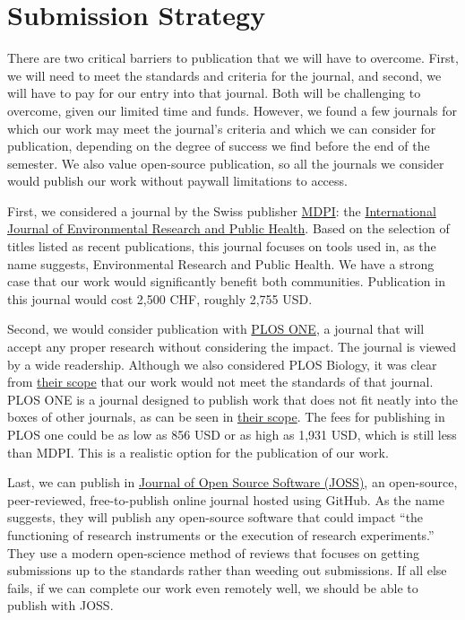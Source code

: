 \section{Submission Strategy}

There are two critical barriers to publication that we will have to overcome. First, we will need to meet the standards and criteria for the journal, and second, we will have to pay for our entry into that journal. Both will be challenging to overcome, given our limited time and funds. However, we found a few journals for which our work may meet the journal's criteria and which we can consider for publication, depending on the degree of success we find before the end of the semester. We also value open-source publication, so all the journals we consider would publish our work without paywall limitations to access. 

First, we considered a journal by the Swiss publisher \href{https://www.mdpi.com/}{MDPI}: the \href{https://www.mdpi.com/journal/ijerph}{International Journal of Environmental Research and Public Health}. Based on the selection of titles listed as recent publications, this journal focuses on tools used in, as the name suggests, Environmental Research and Public Health. We have a strong case that our work would significantly benefit both communities. Publication in this journal would cost 2,500 CHF, roughly 2,755 USD. 

Second, we would consider publication with \href{https://journals.plos.org/plosone/s/journal-information}{PLOS ONE}, a journal that will accept any proper research without considering the impact. The journal is viewed by a wide readership. Although we also considered PLOS Biology, it was clear from \href{https://journals.plos.org/plosbiology/s/journal-information#loc-scope}{their scope} that our work would not meet the standards of that journal. PLOS ONE is a journal designed to publish work that does not fit neatly into the boxes of other journals, as can be seen in \href{https://journals.plos.org/plosone/s/journal-information#loc-scope}{their scope}. The fees for publishing in PLOS one could be as low as 856 USD or as high as 1,931 USD, which is still less than MDPI. This is a realistic option for the publication of our work. 

Last, we can publish in \href{https://joss.theoj.org/}{Journal of Open Source Software (JOSS)}, an open-source, peer-reviewed, free-to-publish online journal hosted using GitHub. As the name suggests, they will publish any open-source software that could impact ``the functioning of research instruments or the execution of research experiments.'' They use a modern open-science method of reviews that focuses on getting submissions up to the standards rather than weeding out submissions. If all else fails, if we can complete our work even remotely well, we should be able to publish with JOSS. 

